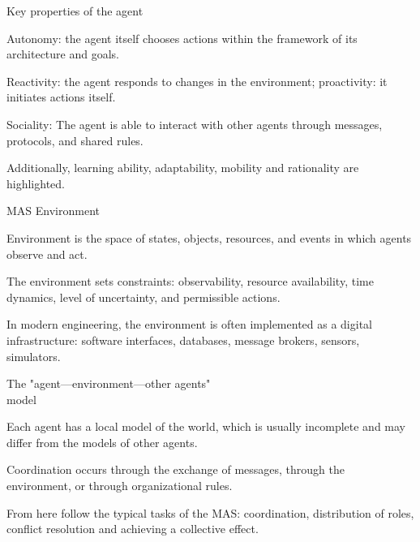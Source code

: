 \begin{frame}{Key properties of the agent}
	\topline
	\justifying
	\begin{textitemize}
		\item Autonomy: the agent itself chooses actions within the framework of its architecture and goals.
		\item Reactivity: the agent responds to changes in the environment; proactivity: it initiates actions itself.
		\item Sociality: The agent is able to interact with other agents through messages, protocols, and shared rules.
		\item Additionally, learning ability, adaptability, mobility and rationality are highlighted.
	\end{textitemize}
\end{frame}

\begin{frame}{MAS Environment}
	\topline
	\justifying
	\begin{textitemize}
		\item Environment is the space of states, objects, resources, and events in which agents observe and act.
		\item The environment sets constraints: observability, resource availability, time dynamics, level of uncertainty, and permissible actions.
		\item In modern engineering, the environment is often implemented as a digital infrastructure: software interfaces, databases, message brokers, sensors, simulators.
	\end{textitemize}
\end{frame}

\begin{frame}{The "agent---environment---other agents"{}\\ model}
	\topline
	\justifying
	\begin{textitemize}
		\item Each agent has a local model of the world, which is usually incomplete and may differ from the models of other agents.
		\item Coordination occurs through the exchange of messages, through the\\ environment, or through organizational rules.
		\item From here follow the typical tasks of the MAS: coordination, distribution of roles, conflict resolution and achieving a collective effect.
	\end{textitemize}
\end{frame}

